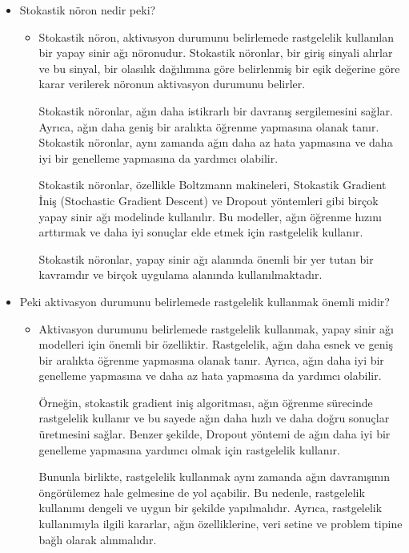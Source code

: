 \documentclass[11pt]{article}
\begin{document}
\begin{itemize}
\begin{itemize}
{Sonuç olarak, Boltzmann makineleri, sinir ağları alanında önemli bir yere sahip bir modeldir ve birçok uygulama alanında kullanılmaktadır.}
        \end{itemize}
        \item{Stokastik nöron nedir peki?}
        \begin{itemize}
            \item {Stokastik nöron, aktivasyon durumunu belirlemede rastgelelik kullanılan bir yapay sinir ağı nöronudur. Stokastik nöronlar, bir giriş sinyali alırlar ve bu sinyal, bir olasılık dağılımına göre belirlenmiş bir eşik değerine göre karar verilerek nöronun aktivasyon durumunu belirler.

Stokastik nöronlar, ağın daha istikrarlı bir davranış sergilemesini sağlar. Ayrıca, ağın daha geniş bir aralıkta öğrenme yapmasına olanak tanır. Stokastik nöronlar, aynı zamanda ağın daha az hata yapmasına ve daha iyi bir genelleme yapmasına da yardımcı olabilir.

Stokastik nöronlar, özellikle Boltzmann makineleri, Stokastik Gradient İniş (Stochastic Gradient Descent) ve Dropout yöntemleri gibi birçok yapay sinir ağı modelinde kullanılır. Bu modeller, ağın öğrenme hızını arttırmak ve daha iyi sonuçlar elde etmek için rastgelelik kullanır.

Stokastik nöronlar, yapay sinir ağı alanında önemli bir yer tutan bir kavramdır ve birçok uygulama alanında kullanılmaktadır.}
        \end{itemize}
        \item{Peki aktivasyon durumunu belirlemede rastgelelik kullanmak önemli midir?}
        \begin{itemize}
            \item {Aktivasyon durumunu belirlemede rastgelelik kullanmak, yapay sinir ağı modelleri için önemli bir özelliktir. Rastgelelik, ağın daha esnek ve geniş bir aralıkta öğrenme yapmasına olanak tanır. Ayrıca, ağın daha iyi bir genelleme yapmasına ve daha az hata yapmasına da yardımcı olabilir.

Örneğin, stokastik gradient iniş algoritması, ağın öğrenme sürecinde rastgelelik kullanır ve bu sayede ağın daha hızlı ve daha doğru sonuçlar üretmesini sağlar. Benzer şekilde, Dropout yöntemi de ağın daha iyi bir genelleme yapmasına yardımcı olmak için rastgelelik kullanır.

Bununla birlikte, rastgelelik kullanmak aynı zamanda ağın davranışının öngörülemez hale gelmesine de yol açabilir. Bu nedenle, rastgelelik kullanımı dengeli ve uygun bir şekilde yapılmalıdır. Ayrıca, rastgelelik kullanımıyla ilgili kararlar, ağın özelliklerine, veri setine ve problem tipine bağlı olarak alınmalıdır.

}
\end{itemize}
\end{itemize}
\end{document}

